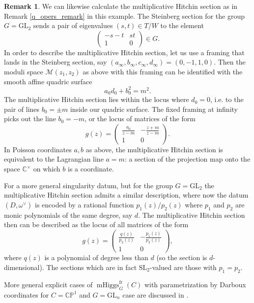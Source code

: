 \documentclass[11pt, oneside, reqno]{amsart}
\theoremstyle{definition} \newtheorem{definition}{Definition}[section]
\theoremstyle{definition} \newtheorem{remark}[definition]{Remark}
\theoremstyle{definition} \newtheorem{remarks}[definition]{Remarks}
\theoremstyle{definition} \newtheorem{question}[definition]{Question}
\theoremstyle{definition} \newtheorem*{note}{Note}
\theoremstyle{definition} \newtheorem{example}[definition]{Example}
\theoremstyle{definition} \newtheorem{examples}[definition]{Examples}
\newcommand{\bb}[1]{\mathbb{#1}}
\newcommand{\mc}[1]{\mathcal{#1}}
\newcommand{\CC}{\mathbb{C}}
\newcommand{\SL}{\mathrm{SL}}
\newcommand{\GL}{\mathrm{GL}}
\DeclareMathOperator{\mhiggs}{mHiggs}
\newcommand{\fr}{\mathrm{fr}}
\begin{document}
\begin{remark}
We can likewise calculate the multiplicative Hitchin section as in Remark \ref{q_opers_remark} in this example.  The Steinberg section for the group $G = \GL_2$ sends a pair of eigenvalues $(s,t) \in T/W$ to the element
\[\begin{pmatrix}-s-t & st \\ 1 & 0\end{pmatrix} \in G.\]
In order to describe the multiplicative Hitchin section, let us use a framing that lands in the Steinberg section, say $(a_\infty, b_\infty,c_\infty, d_\infty) = (0,-1,1,0)$.  Then the moduli space $\mc M(z_1,z_2)$ as above with this framing can be identified with the smooth affine quadric surface 
    \begin{equation*}
        a_0d_0 + b_0^2  = m^2 .
    \end{equation*}
The multiplicative Hitchin section lies within the locus where $d_0=0$, i.e. to the pair of lines $b_0 = \pm m$ inside our quadric surface.  The fixed framing at infinity picks out the line $b_0 = - m$, or the locus of matrices of the form 
\[g(z) = \begin{pmatrix} \frac{a_0}{z-m} & - \frac{z+m}{z-m} \\ 1 & 0\end{pmatrix}.\]
In Poisson coordinates $a,b$ as above, the multiplicative Hitchin section is equivalent to the Lagrangian line $a = m$: a section of the projection map onto the space $\CC^\times$ on which $b$ is a coordinate.    

For a more general singularity datum, but for the group $G=\GL_2$ the multiplicative Hitchin section admits a similar description, where now the datum $(D,\omega^\vee)$ is encoded by a rational function $p_1(z)/p_2(z)$ where $p_1$ and $p_2$ are monic polynomials of the same degree, say $d$.  The multiplicative Hitchin section then can be described as the locus of all matrices of the form
\[g(z) = \begin{pmatrix} \frac{q(z)}{p_2(z)} & - \frac{p_1(z)}{p_2(z)} \\ 1 & 0\end{pmatrix},\]
where $q(z)$ is a polynomial of degree less than $d$ (so the section is $d$-dimensional).  The sections which are in fact $\SL_2$-valued are those with $p_1 = p_2$.
\end{remark}

More general explicit cases of $\mhiggs^\fr_G(C)$ with parametrization by Darboux coordinates for $C = \bb{CP}^1$ and $G=\GL_n$ case are discussed in \cite{FrassekPestun}.
  
\end{document}
